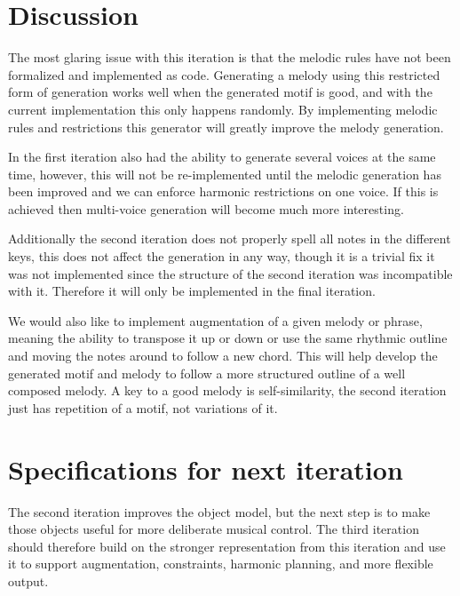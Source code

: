 \section{Discussion}
  The most glaring issue with this iteration is that the melodic rules have not been formalized and implemented as code. Generating a melody using this restricted form of generation works well when the generated motif is good, and with the current implementation this only happens randomly. By implementing melodic rules and restrictions this generator will greatly improve the melody generation.

  In the first iteration also had the ability to generate several voices at the same time, however, this will not be re-implemented until the melodic generation has been improved and we can enforce harmonic restrictions on one voice. If this is achieved then multi-voice generation will become much more interesting. 

  Additionally the second iteration does not properly spell all notes in the different keys, this does not affect the generation in any way, though it is a trivial fix it was not implemented since the structure of the second iteration was incompatible with it. Therefore it will only be implemented in the final iteration.

  We would also like to implement augmentation of a given melody or phrase, meaning the ability to transpose it up or down or use the same rhythmic outline and moving the notes around to follow a new chord. This will help develop the generated motif and melody to follow a more structured outline of a well composed melody. A key to a good melody is self-similarity, the second iteration just has repetition of a motif, not variations of it. \\

  \section{Specifications for next iteration}
  The second iteration improves the object model, but the next step is to make those objects useful for more deliberate musical control. The third iteration should therefore build on the stronger representation from this iteration and use it to support augmentation, constraints, harmonic planning, and more flexible output.

